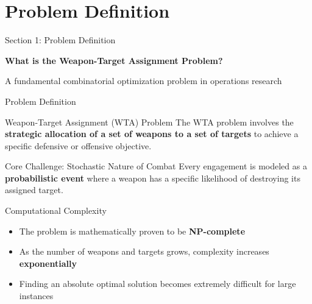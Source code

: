 \documentclass[aspectratio=43,8pt]{beamer}
\begin{document}
\section{Problem Definition}

\begin{frame}{Section 1: Problem Definition}
\begin{center}
{\Large\textcolor{primaryblue}{\textbf{What is the Weapon-Target Assignment Problem?}}}

\vspace{0.5cm}
{\normalsize A fundamental combinatorial optimization problem in operations research}
\end{center}
\end{frame}

\begin{frame}{Problem Definition}
\begin{block}{Weapon-Target Assignment (WTA) Problem}
The WTA problem involves the \textbf{strategic allocation of a set of weapons to a set of targets} to achieve a specific defensive or offensive objective.
\end{block}

\vspace{0.3cm}
\begin{alertblock}{Core Challenge: Stochastic Nature of Combat}
Every engagement is modeled as a \textbf{probabilistic event} where a weapon has a specific likelihood of destroying its assigned target.
\end{alertblock}

\vspace{0.3cm}
\begin{exampleblock}{Computational Complexity}
\begin{itemize}
    \item The problem is mathematically proven to be \textbf{NP-complete}
    \item As the number of weapons and targets grows, complexity increases \textbf{exponentially}
    \item Finding an absolute optimal solution becomes extremely difficult for large instances
\end{itemize}
\end{exampleblock}
\end{frame}
\end{document}
